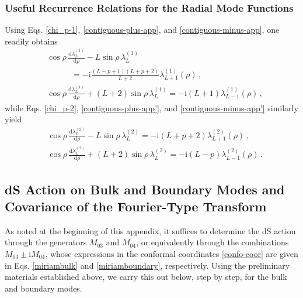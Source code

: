 \documentclass[aps,twocolumn,nofootinbib]{revtex4}
\begin{document}
{\begin{appendix}
\subsubsection{Useful Recurrence Relations for the Radial Mode Functions}

Using Eqs. \eqref{chi_p-1}, \eqref{contiguous-plus-app}, and \eqref{contiguous-minus-app}, one readily obtains
\begin{align}
    &\cos\rho\,\frac{\mathrm{d}\lambda_L^{(1)}}{\mathrm{d}\rho} -L \sin\rho\,\lambda_L^{(1)} \nonumber\\[3pt]
    &\qquad\quad = -\mathrm{i}\frac{(L-p+1)(L+p+2)}{L+2}\lambda_{L+1}^{(1)}(\rho)\,, \\[3pt]
    &\cos\rho\,\frac{\mathrm{d}\lambda_L^{(1)}}{\mathrm{d}\rho} + (L+2) \sin\rho\,\lambda_L^{(1)} = -\mathrm{i} (L+1) \lambda_{L-1}^{(1)}(\rho) \,,
\end{align}
while Eqs. \eqref{chi_p-2}, \eqref{contiguous-plus-app'}, and \eqref{contiguous-minus-app'} similarly yield
\begin{align}
    &\cos\rho\,\frac{\mathrm{d}\lambda_L^{(2)}}{\mathrm{d}\rho} -L \sin\rho\,\lambda_L^{(2)} = -\mathrm{i}(L+p+2)\lambda_{L+1}^{(2)}(\rho) \,, \\[3pt]
    &\cos\rho\,\frac{\mathrm{d}\lambda_L^{(2)}}{\mathrm{d}\rho} + (L+2) \sin\rho\,\lambda_L^{(2)} = -\mathrm{i}(L-p)\lambda_{L-1}^{(2)}(\rho) \,.
\end{align}


\subsection{dS Action on Bulk and Boundary Modes and Covariance of the Fourier-Type Transform}\label{subsec:ladder}

As noted at the beginning of this appendix, it suffices to determine the dS action through the generators $M_{03}$ and $M_{04}$, or equivalently through the combinations $M_{03}\pm \mathrm{i}M_{04}$, whose expressions in the conformal coordinates \eqref{confo-coor} are given in Eqs. \eqref{miriambulk} and \eqref{miriamboundary}, respectively. Using the preliminary materials established above, we carry this out below, step by step, for the bulk and boundary modes.



\end{appendix}}
\end{document}
